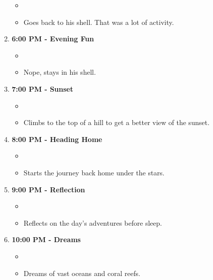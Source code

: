 \documentclass{article}
\begin{document}
\begin{enumerate}
\begin{itemize}
\item %
\item Goes back to his shell. That was a lot of activity.
\end{itemize}
\item \textbf{6:00 PM - Evening Fun}
\begin{itemize}
\item %
\item Nope, stays in his shell.
\end{itemize}
\item \textbf{7:00 PM - Sunset}
\begin{itemize}
\item %
\item Climbs to the top of a hill to get a better view of the sunset.
\end{itemize}
\item \textbf{8:00 PM - Heading Home}
\begin{itemize}
\item %
\item Starts the journey back home under the stars.
\end{itemize}
\item \textbf{9:00 PM - Reflection}
\begin{itemize}
\item %
\item Reflects on the day's adventures before sleep.
\end{itemize}
\item \textbf{10:00 PM - Dreams}
\begin{itemize}
\item %

\item Dreams of vast oceans and coral reefs.
\end{itemize}

\end{enumerate}
\end{document}
